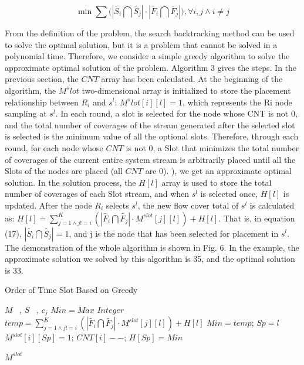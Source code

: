\documentclass[conference,compsoc]{IEEEtran}
\begin{document}
\begin{equation}
\min \sum{(\left| \widetilde{{{S}_{i}}}\bigcap \widetilde{{{S}_{j}}} \right|}\cdot \left| \widetilde{{{F}_{i}}}\bigcap \widetilde{{{F}_{j}}} \right|),\forall i,j\wedge i\ne j
\end{equation}

From the definition of the problem, the search backtracking method can be used to solve the optimal solution, but it is a problem that cannot be solved in a polynomial time. Therefore, we consider a simple greedy algorithm to solve the approximate optimal solution of the problem.
Algorithm 3 gives the steps. In the previous section, the $CNT$ array has been calculated. At the beginning of the algorithm, the $M^slot$ two-dimensional array is initialized to store the placement relationship between $R_i$ and $s^l$: $M^slot[i][l] = 1$, which represents the Ri node sampling at $s^l$. In each round, a slot is selected for the node whose CNT is not 0, and the total number of coverages of the stream generated after the selected slot is selected is the minimum value of all the optional slots. Therefore, through each round, for each node whose $CNT$ is not 0, a Slot that minimizes the total number of coverages of the current entire system stream is arbitrarily placed until all the Slots of the nodes are placed (all $CNT$ are 0). ), we get an approximate optimal solution.
In the solution process, the $H[l]$ array is used to store the total number of coverages of each Slot stream, and when $s^l$ is selected once, $H[l]$ is updated. After the node $R_i$ selects $s^l$, the new flow cover total of $s^l$ is calculated as: $H[l] = \sum^{K}_{j=1 \wedge j != i}(\left| \widetilde{{{F}_{i}}}\bigcap \widetilde{{{F}_{j}}} \right| \cdot M^{slot}[j][l]) + H[l]$. That is, in equation (17), $\left| \widetilde{{{S}_{i}}}\bigcap \widetilde{{{S}_{j}}} \right| = 1$, and j is the node that has been selected for placement in $s^l$. The demonstration of the whole algorithm is shown in Fig. 6. In the example, the approximate solution we solved by this algorithm is 35, and the optimal solution is 33.
\begin{algorithm}[h]
\caption{Order of Time Slot Based on Greedy}
\begin{algorithmic}[1]
\REQUIRE  $M$ ~, $S$ ~, $c_j$
\STATE $Min = Max$ $Integer$
\STATE $temp = \sum^{K}_{j=1 \wedge j != i}(\left| \widetilde{{{F}_{i}}}\bigcap \widetilde{{{F}_{j}}} \right| \cdot M^{slot}[j][l]) + H[l] $
\STATE $Min = temp$; $Sp = l$ 
\ENDIF
\ENDIF
\ENDFOR
\STATE$M^{slot}[i][Sp] = 1$; $ CNT[i]--$; $H[Sp] = Min$
\ENDIF
\ENDFOR
\ENDWHILE

\RETURN $M^{slot}$
\label{code:recentEnd}
\end{algorithmic}
\end{algorithm}
\end{document}
